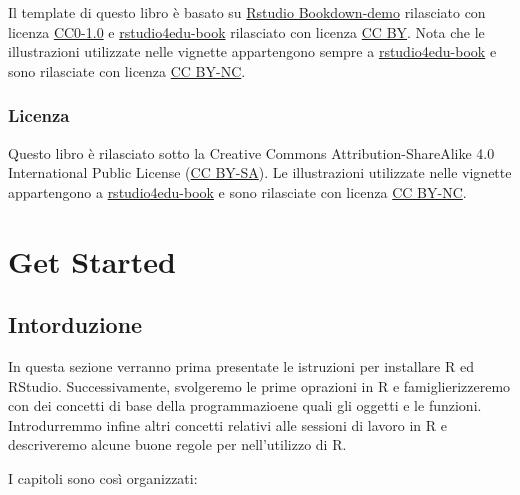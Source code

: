 \documentclass[
]{book}
\begin{document}
Il template di questo libro è basato su \href{https://github.com/rstudio/bookdown-demo}{Rstudio Bookdown-demo} rilasciato con licenza \href{https://creativecommons.org/publicdomain/zero/1.0/}{CC0-1.0} e \href{https://rstudio4edu.github.io/rstudio4edu-book/}{rstudio4edu-book} rilasciato con licenza \href{https://creativecommons.org/licenses/by/2.0/}{CC BY}. Nota che le illustrazioni utilizzate nelle vignette appartengono sempre a \href{https://rstudio4edu.github.io/rstudio4edu-book/}{rstudio4edu-book} e sono rilasciate con licenza \href{https://creativecommons.org/licenses/by-nc/2.0/}{CC BY-NC}.

\hypertarget{licenza}{%
\section*{Licenza}\label{licenza}}

Questo libro è rilasciato sotto la Creative Commons Attribution-ShareAlike 4.0 International Public License (\href{https://creativecommons.org/licenses/by-sa/4.0/legalcode}{CC BY-SA}).
Le illustrazioni utilizzate nelle vignette appartengono a \href{https://rstudio4edu.github.io/rstudio4edu-book/}{rstudio4edu-book} e sono rilasciate con licenza \href{https://creativecommons.org/licenses/by-nc/2.0/}{CC BY-NC}.

\hypertarget{part-get-started}{%
\part*{Get Started}\label{part-get-started}}

\hypertarget{intorduzione}{%
\chapter*{Intorduzione}\label{intorduzione}}

In questa sezione verranno prima presentate le istruzioni per installare R ed RStudio. Successivamente, svolgeremo le prime oprazioni in R e famiglierizzeremo con dei concetti di base della programmazioene quali gli oggetti e le funzioni. Introdurremmo infine altri concetti relativi alle sessioni di lavoro in R e descriveremo alcune buone regole per nell'utilizzo di R.

I capitoli sono così organizzati:
\end{document}
